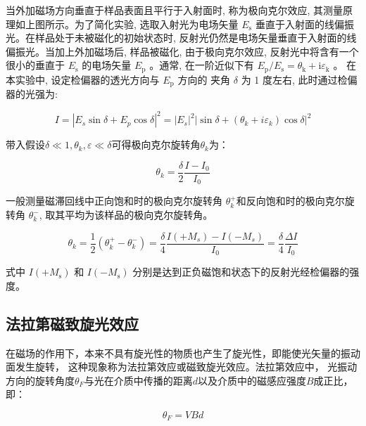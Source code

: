 \documentclass[a4paper,UTF8]{ctexart}
\begin{document}
当外加磁场方向垂直于样品表面且平行于入射面时, 称为极向克尔效应, 
其测量原理如上图所示。为了简化实验, 选取入射光为电场矢量 $E_{\mathrm{s}}$ 
垂直于入射面的线偏振光。在样品处于未被磁化的初始状态时, 
反射光仍然是电场矢量垂直于入射面的线偏振光。当加上外加磁场后, 样品被磁化, 
由于极向克尔效应, 反射光中将含有一个很小的垂直于 $E_{\mathrm{s}}$ 的电场矢量
 $E_{\mathrm{p}}$ 。通常, 在一阶近似下有 
 $E_{\mathrm{p}} / E_{\mathrm{s}}=\theta_{\mathrm{k}}+\mathrm{i} \varepsilon_{\mathrm{k}}$ 。
 在本实验中, 设定检偏器的透光方向与 $E_{\mathrm{p}}$ 方向的
 夹角 $\delta$ 为 1 度左右, 此时通过检偏器的光强为:

\begin{equation}
I=\left|E_s \sin \delta+E_p \cos \delta\right|^2=\left|E_s\right|^2\left|\sin \delta+\left(\theta_k+i \varepsilon_k\right) \cos \delta\right|^2
\end{equation}

带入假设$\delta \ll 1, \theta_k,\varepsilon \ll \delta$可得极向克尔旋转角$\theta_k$为：

\begin{equation}
\theta_k=\frac{\delta}{2} \frac{I-I_0}{I_0}
\end{equation}

一般测量磁滞回线中正向饱和时的极向克尔旋转角 $\theta_k^{+}$和反向饱和时的极向克尔旋转角 $\theta_k^{-}$, 取其平均为该样品的极向克尔旋转角。

\begin{equation}
\theta_k=\frac{1}{2}\left(\theta_k^{+}-\theta_k^{-}\right)=\frac{\delta}{4} \frac{I\left(+M_s\right)-I\left(-M_s\right)}{I_0}=\frac{\delta}{4} \frac{\Delta I}{I_0}
\end{equation}

式中 $I\left(+M_{\mathrm{s}}\right)$ 和 $I\left(-M_{\mathrm{s}}\right)$ 分别是达到正负磁饱和状态下的反射光经检偏器的强度。

\subsection{法拉第磁致旋光效应}

在磁场的作用下，本来不具有旋光性的物质也产生了旋光性，即能使光矢量的振动面发生旋转，
这种现象称为法拉第效应或磁致旋光效应。法拉第效应中，
光振动方向的旋转角度$\theta_F$与光在介质中传播的距离$d$以及介质中的磁感应强度$B$成正比，即：

\begin{equation}
    \theta_F = V  B  d
\end{equation}
\end{document}
